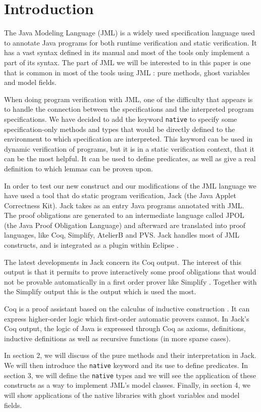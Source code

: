 
\section{Introduction}
The Java Modeling Language (JML) is a widely used specification language used to annotate Java programs 
for both runtime verification and static verification. It has a vast syntax defined in its manual and most 
of the tools only implement a part of its syntax. The part of JML we will be interested to in this paper
is one that is common in most of the tools using JML \cite{BurdyEtAl05:STTT}: pure methods,  
ghost variables and  model fields. 

When doing program verification with JML, one of the difficulty that appears
is to handle the connection between the specifications and the interpreted program specifications.
We have decided to add the keyword {\tt native}
to specify some specification-only methods and types that would be directly defined to
the environment to which specification are interpreted. This keyword can be used in dynamic 
verification of programs, but it is in a static verification context, that it can be the most helpful.
It can be used to define predicates, as well as give a real definition to which lemmas can
be proven upon.

In order to test our new construct and our modifications of the JML language we have used
a tool that do static program verification,  Jack 
(the Java Applet Correctness Kit)\cite{BRL-03-JACK,Jack-Web}. 
Jack takes as an entry Java programs annotated with JML. 
The proof obligations are generated to an intermediate language called JPOL (the Java
Proof Obligation Language) and afterward are translated into proof languages, like Coq, Simplify, AtelierB 
and PVS. 
Jack handles most of JML constructs, and is integrated as a plugin within Eclipse \cite{Eclipse-Web}.

The latest developments in Jack concern its Coq output. 
The interest of this output is that it permits to prove interactively some proof 
obligations that would not be provable automatically in a first order 
prover like Simplify \cite{simplify}.
Together with the Simplify output this is the output which is used the most.

Coq is a proof assistant based on the calculus of inductive construction \cite{BC-04-COQ}. 
It can express 
higher-order logic which first-order automatic provers cannot. In Jack's Coq output, the logic of 
Java is  expressed through Coq as axioms, definitions, inductive definitions as well as recursive 
functions (in more sparse cases).

In section 2,  we will discuss of the pure methods and their interpretation in Jack. We will then introduce
the {\tt native} keyword and its use to define predicates.
In section 3, we will define the {\tt native} types and we will see the application of these constructs 
as a way to implement JML's model classes.
Finally, in section 4, we will show applications of the native libraries with 
 ghost variables and model fields.
